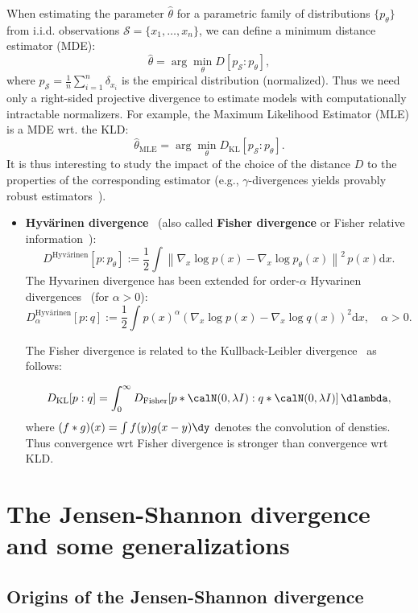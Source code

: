 \documentclass[11pt]{article}
\def\KL{\mathrm{KL}}
\def\calS{\mathcal{S}}
\def\KL{\mathrm{KL}}
\begin{document}
When estimating the parameter $\hat\theta$ for a parametric family of distributions $\{p_\theta\}$ from i.i.d. observations $\calS=\{x_1,\ldots,x_n\}$, we can define a minimum distance estimator (MDE):
$$
\hat\theta=\arg\min_\theta D[p_\calS:p_\theta],
$$
where $p_\calS=\frac{1}{n}\sum_{i=1}^n \delta_{x_i}$ is the empirical distribution (normalized).
Thus we need only a right-sided projective divergence to estimate models with computationally intractable normalizers.
For example, the Maximum Likelihood Estimator (MLE) is a MDE wrt. the KLD:
$$
\hat\theta_{\mathrm{MLE}}=\arg\min_\theta D_\KL[p_\calS:p_\theta].
$$
It is thus interesting to study the impact of the choice of the distance $D$ to the properties of the corresponding estimator (e.g., $\gamma$-divergences yields provably robust estimators~\cite{gammadivergence-2008}).



\begin{itemize}
	\item {\bf Hyv\"arinen divergence}~\cite{hyvarinen2005estimation} (also called {\bf Fisher divergence} or Fisher relative information~\cite{otto2000generalization}):
	$$
	D^{\mbox{Hyv\"arinen}}\left[p: p_{\theta}\right]:=\frac{1}{2} \int\left\|\nabla_{x} \log p(x)-\nabla_{x} \log p_{\theta}(x)\right\|^{2}\, p(x) \mathrm{d} x.
	$$
	The Hyvarinen divergence has been extended for order-$\alpha$ Hyvarinen divergences~\cite{nielsen2021fast} (for $\alpha>0$):
	$$
	D^{\mbox{Hyv\"arinen}}_{\alpha}[p: q]:=\frac{1}{2} \int p(x)^{\alpha} \left(\nabla_{x} \log p(x)-\nabla_{x} \log q(x)\right)^{2} \mathrm{d} x, \quad \alpha>0 .
	$$
	
	The Fisher divergence is related to the Kullback-Leibler divergence~\cite{sriperumbudur2017density} as follows:
	
$$
D_\KL[p:q]=\int_0^\infty D_{\mathrm{Fisher}}[p*\calN(0,\lambda I):q*\calN(0,\lambda I)]\, \dlambda,
$$
where $(f*g)(x)=\int f(y)g(x-y)\dy$ denotes the convolution of densties.
Thus convergence wrt Fisher divergence is stronger than convergence wrt KLD.


	
\end{itemize}


\section{The Jensen-Shannon divergence and some generalizations}

\subsection{Origins of the Jensen-Shannon divergence}
\end{document}
